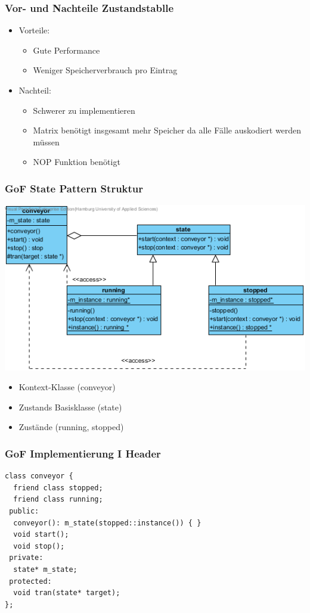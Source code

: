 \documentclass{beamer}
\begin{document}
\begin{frame}
 \frametitle{Vor- und Nachteile Zustandstablle}
 \begin{itemize}
  \item Vorteile:
  \begin{itemize}
   \item Gute Performance
   \item Weniger Speicherverbrauch pro Eintrag
  \end{itemize}
  \item Nachteil:
  \begin{itemize}
   \item Schwerer zu implementieren
   \item Matrix ben\"otigt insgesamt mehr Speicher da alle F\"alle auskodiert werden m\"ussen
   \item NOP Funktion ben\"otigt
  \end{itemize}
 \end{itemize}
\end{frame}

\begin{frame}
 \frametitle{GoF State Pattern Struktur}
 \begin{center}
   \includegraphics[scale=.65]{img/GoF_pure.png}
 \end{center}
 \begin{itemize}
  \item Kontext-Klasse (conveyor)
  \item Zustands Basisklasse (state)
  \item Zust\"ande (running, stopped)
 \end{itemize}
\end{frame}

\begin{frame}[fragile]
 \frametitle{GoF Implementierung I Header}
 \begin{lstlisting}
class conveyor {
  friend class stopped;
  friend class running;
 public:
  conveyor(): m_state(stopped::instance()) { }
  void start();
  void stop();
 private:
  state* m_state;
 protected:
  void tran(state* target);
};
 \end{lstlisting}
\end{frame}
\end{document}
